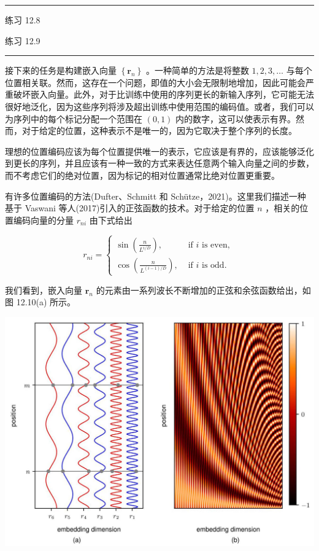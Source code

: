 \documentclass[10pt]{article}
\newcommand{\HRule}{\begin{center}\rule{0.9\linewidth}{0.2mm}\end{center}}
\begin{document}
\HRule

练习 12.8

练习 12.9

\HRule

接下来的任务是构建嵌入向量 \(\left\{  {\mathbf{r}}_{n}\right\}\) 。一种简单的方法是将整数 \(1,2,3,\ldots\) 与每个位置相关联。然而，这存在一个问题，即值的大小会无限制地增加，因此可能会严重破坏嵌入向量。此外，对于比训练中使用的序列更长的新输入序列，它可能无法很好地泛化，因为这些序列将涉及超出训练中使用范围的编码值。或者，我们可以为序列中的每个标记分配一个范围在 \(\left( {0,1}\right)\) 内的数字，这可以使表示有界。然而，对于给定的位置，这种表示不是唯一的，因为它取决于整个序列的长度。

理想的位置编码应该为每个位置提供唯一的表示，它应该是有界的，应该能够泛化到更长的序列，并且应该有一种一致的方式来表达任意两个输入向量之间的步数，而不考虑它们的绝对位置，因为标记的相对位置通常比绝对位置更重要。

有许多位置编码的方法(Dufter、Schmitt 和 Schütze，2021)。这里我们描述一种基于 Vaswani 等人(2017)引入的正弦函数的技术。对于给定的位置 \(n\) ，相关的位置编码向量的分量 \({r}_{ni}\) 由下式给出

\[
{r}_{ni} = \left\{  \begin{array}{ll} \sin \left( \frac{n}{{L}^{i/D}}\right) , & \text{ if }i\text{ is even, } \\  \cos \left( \frac{n}{{L}^{\left( {i - 1}\right) /D}}\right) , & \text{ if }i\text{ is odd. } \end{array}\right.  \tag{12.25}
\]

我们看到，嵌入向量 \({\mathbf{r}}_{n}\) 的元素由一系列波长不断增加的正弦和余弦函数给出，如图 12.10(a) 所示。

\begin{center}
\includegraphics[max width=1.0\textwidth]{images/0194e279-9b28-703a-88f4-c3ac21e2010d_392_232_598_1291_955_0.jpg}
\end{center}
\hspace*{3em} 
\end{document}

